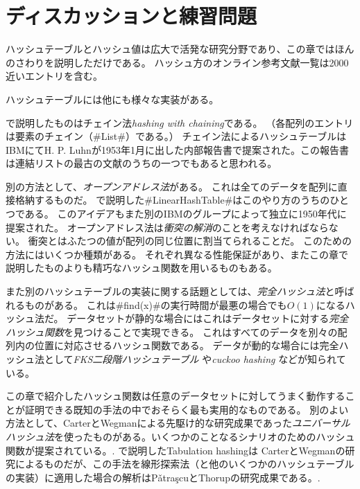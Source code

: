 \section{ディスカッションと練習問題}

ハッシュテーブルとハッシュ値は広大で活発な研究分野であり、この章ではほんのさわりを説明しただけである。
ハッシュ方のオンライン参考文献一覧は\cite{hashing}2000近いエントリを含む。

ハッシュテーブルには他にも様々な実装がある。

で説明したものはチェイン法\emph{hashing with chaining}である。%
（各配列のエントリは要素のチェイン（#List#）である。）
チェイン法によるハッシュテーブルはIBMにてH. P. Luhnが1953年1月に出した内部報告書で提案された。この報告書は連結リストの最古の文献のうちの一つでもあると思われる。

%
別の方法として、\emph{オープンアドレス法}がある。
これは全てのデータを配列に直接格納するものだ。
で説明した#LinearHashTable#はこのやり方のうちのひとつである。
このアイデアもまた別のIBMのグループによって独立に1950年代に提案された。
オープンアドレス法は\emph{衝突の解消}のことを考えなければならない。
%
衝突とはふたつの値が配列の同じ位置に割当てられることだ。
このための方法にはいくつか種類がある。
それぞれ異なる性能保証があり、またこの章で説明したものよりも精巧なハッシュ関数を用いるものもある。

また別のハッシュテーブルの実装に関する話題としては、\emph{完全ハッシュ法}と呼ばれるものがある。
%
これは#find(x)#の実行時間が最悪の場合でも$O(1)$になるハッシュ法だ。
データセットが静的な場合にはこれはデータセットに対する\emph{完全ハッシュ関数}を見つけることで実現できる。
%
%
これはすべてのデータを別々の配列内の位置に対応させるハッシュ関数である。
データが動的な場合には完全ハッシュ法として\emph{FKS二段階ハッシュテーブル}
%
%
\cite{fks84,dkkmrt94}
や\emph{cuckoo hashing} \cite{pr04}などが知られている。
%
%

この章で紹介したハッシュ関数は任意のデータセットに対してうまく動作することが証明できる既知の手法の中でおそらく最も実用的なものである。
別のよい方法として、CarterとWegmanによる先駆け的な研究成果であった\emph{ユニバーサルハッシュ法}を使ったものがある。いくつかのことなるシナリオのためのハッシュ関数が提案されている。\cite{cw79}.
%
%
で説明したTabulation hashingは
CarterとWegmanの研究\cite{cw79}によるものだが、この手法を線形探索法（と他のいくつかのハッシュテーブルの実装）に適用した場合の解析はP\v{a}tra\c{s}cuとThorupの研究成果である。\cite{pt12}.

